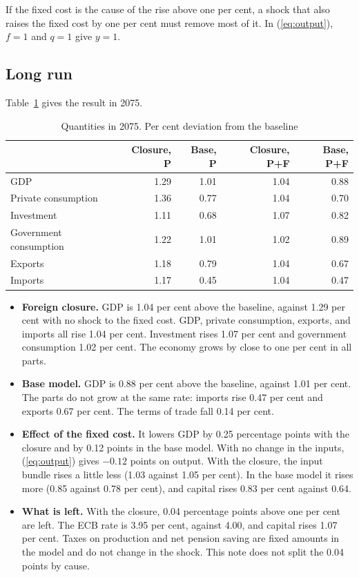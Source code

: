 \documentclass[11pt,a4paper]{article}
\begin{document}
If the fixed cost is the cause of the rise above one per cent, a shock that also raises the fixed cost by one per cent must remove most of it. In (\ref{eq:output}), $f = 1$ and $q = 1$ give $y = 1$.

\subsection{Long run}

Table~\ref{tab:demand} gives the result in 2075.

\begin{table}[H]
\centering
\small
\caption{Quantities in 2075. Per cent deviation from the baseline}
\label{tab:demand}
\begin{tabular}{@{}lrrrr@{}}
\toprule
 & Closure, P & Base, P & Closure, P+F & Base, P+F \\
\midrule
GDP & 1.29 & 1.01 & 1.04 & 0.88 \\
Private consumption & 1.36 & 0.77 & 1.04 & 0.70 \\
Investment & 1.11 & 0.68 & 1.07 & 0.82 \\
Government consumption & 1.22 & 1.01 & 1.02 & 0.89 \\
Exports & 1.18 & 0.79 & 1.04 & 0.67 \\
Imports & 1.17 & 0.45 & 1.04 & 0.47 \\
\bottomrule
\end{tabular}
\end{table}

\begin{itemize}
\item \textbf{Foreign closure.} GDP is 1.04 per cent above the baseline, against 1.29 per cent with no shock to the fixed cost. GDP, private consumption, exports, and imports all rise 1.04 per cent. Investment rises 1.07 per cent and government consumption 1.02 per cent. The economy grows by close to one per cent in all parts.
\item \textbf{Base model.} GDP is 0.88 per cent above the baseline, against 1.01 per cent. The parts do not grow at the same rate: imports rise 0.47 per cent and exports 0.67 per cent. The terms of trade fall 0.14 per cent.
\item \textbf{Effect of the fixed cost.} It lowers GDP by 0.25 percentage points with the closure and by 0.12 points in the base model. With no change in the inputs, (\ref{eq:output}) gives $-0.12$ points on output. With the closure, the input bundle rises a little less (1.03 against 1.05 per cent). In the base model it rises more (0.85 against 0.78 per cent), and capital rises 0.83 per cent against 0.64.
\item \textbf{What is left.} With the closure, 0.04 percentage points above one per cent are left. The ECB rate is 3.95 per cent, against 4.00, and capital rises 1.07 per cent. Taxes on production and net pension saving are fixed amounts in the model and do not change in the shock. This note does not split the 0.04 points by cause.
\end{itemize}
\end{document}
